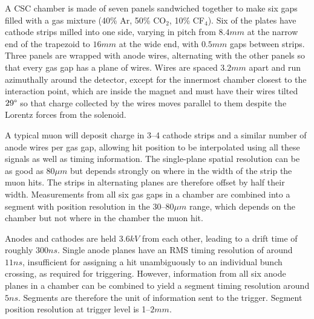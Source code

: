 A CSC chamber is made of seven panels sandwiched together to make six gaps filled with a gas mixture (40\% Ar, 50\% CO$_2$, 10\% CF$_4$).
Six of the plates have cathode strips milled into one side, varying in pitch from $8.4\unit{mm}$ at the narrow end of the trapezoid to $16\unit{mm}$ at the wide end, with $0.5\unit{mm}$ gaps between strips.
Three panels are wrapped with anode wires, alternating with the other panels so that every gas gap has a plane of wires.
Wires are spaced $3.2\unit{mm}$ apart and run azimuthally around the detector, except for the innermost chamber closest to the interaction point, which are inside the magnet and must have their wires tilted $29\degree$ so that charge collected by the wires moves parallel to them despite the Lorentz forces from the solenoid.

A typical muon will deposit charge in 3--4 cathode strips and a similar number of anode wires per gas gap, allowing hit position to be interpolated using all these signals as well as timing information.
The single-plane spatial resolution can be as good as $80\unit{\mu m}$ but depends strongly on where in the width of the strip the muon hits.
The strips in alternating planes are therefore offset by half their width.
Measurements from all six gas gaps in a chamber are combined into a segment with position resolution in the 30--$80\unit{\mu m}$ range, which depends on the chamber but not where in the chamber the muon hit.

Anodes and cathodes are held $3.6\unit{kV}$ from each other, leading to a drift time of roughly $300\unit{ns}$.
Single anode planes have an RMS timing resolution of around $11\unit{ns}$, insufficient for assigning a hit unambiguously to an individual bunch crossing, as required for triggering.
However, information from all six anode planes in a chamber can be combined to yield a segment timing resolution around $5\unit{ns}$.
Segments are therefore the unit of information sent to the trigger.
Segment position resolution at trigger level is 1--$2\unit{mm}$.


